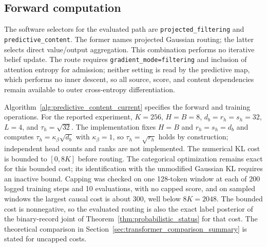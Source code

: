 \documentclass[twoside,11pt]{article}
\begin{document}
\subsection{Forward computation}
The software selectors for the evaluated path are \texttt{projected\_\allowbreak filtering} and \texttt{predictive\_\allowbreak content}. The former names projected Gaussian routing; the latter selects direct value/output aggregation. This combination performs no iterative belief update. The route requires \texttt{gradient\_\allowbreak mode=\allowbreak filtering} and inclusion of attention entropy for admission; neither setting is read by the predictive map, which performs no inner descent, so all source, score, and content dependencies remain available to outer cross-entropy differentiation.

Algorithm~\ref{alg:predictive_content_current} specifies the forward and training operations. For the reported experiment, \(K=256\), \(H=B=8\), \(d_b=r_h=s_h=32\), \(L=4\), and \(\tau_h=\sqrt{32}\). The implementation fixes \(H=B\) and \(r_h=s_h=d_b\) and computes \(\tau_h=\kappa_\beta\sqrt{d_b}\) with \(\kappa_\beta=1\), so \(\tau_h=\sqrt{r_h}\) holds by construction; independent head counts and ranks are not implemented. The numerical KL cost is bounded to \([0,8K]\) before routing. The categorical optimization remains exact for this bounded cost; its identification with the unmodified Gaussian KL requires an inactive bound. Capping was checked on one 128-token window at each of 200 logged training steps and 10 evaluations, with no capped score, and on sampled windows the largest causal cost is about 300, well below \(8K=2048\). The bounded cost is nonnegative, so the evaluated routing is also the exact label posterior of the binary-record joint of Theorem~\ref{thm:probabilistic_status} for that cost. The theoretical comparison in Section~\ref{sec:transformer_comparison_summary} is stated for uncapped costs.
\end{document}

